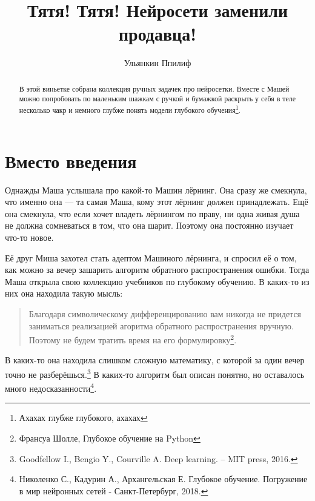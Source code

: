 \documentclass[12pt, a4paper, oneside]{article}
\title{Тятя! Тятя! Нейросети заменили продавца!}
\date{ }
\author{Ульянкин Ппилиф}
\begin{document}
\toggletrue{lecture}

\maketitle

	
\begin{abstract}
    В этой виньетке собрана коллекция ручных задачек про нейросетки. Вместе с Машей можно попробовать по маленьким шажкам с ручкой и бумажкой раскрыть у себя в теле несколько чакр и немного глубже понять модели глубокого обучения\footnote{Ахахах глубже глубокого, ахахах}.
\end{abstract}

\section*{Вместо введения}
    Однажды Маша услышала про какой-то Машин лёрнинг. Она сразу же смекнула, что именно она --- та самая Маша, кому этот лёрнинг должен принадлежать. Ещё она смекнула, что если хочет владеть лёрнингом по праву, ни одна живая душа не должна сомневаться в том, что она шарит. Поэтому она постоянно изучает что-то новое. 
    
    Её друг Миша захотел стать адептом Машиного лёрнинга, и спросил её о том, как можно за вечер зашарить алгоритм обратного распространения ошибки. Тогда Маша открыла свою коллекцию учебников по глубокому обучению. В каких-то из них она находила такую мысль:  
    
    \begin{quote}
    Благодаря символическому дифференцированию вам никогда не придется заниматься реализацией агоритма обратного распространения вручную. Поэтому не будем тратить время на его формулировку\footnote{Франсуа Шолле, Глубокое обучение на Python}.
    \end{quote} 
    
    В каких-то она находила слишком сложную математику, с которой за один вечер точно не разберёшься.\footnote{Goodfellow I., Bengio Y., Courville A. Deep learning. – MIT press, 2016.} В каких-то алгоритм был описан понятно, но оставалось много недосказанности\footnote{Николенко С., Кадурин А., Архангельская Е. Глубокое обучение. Погружение в мир нейронных сетей - Санкт-Петербург, 2018.}. 
    
\end{document}
